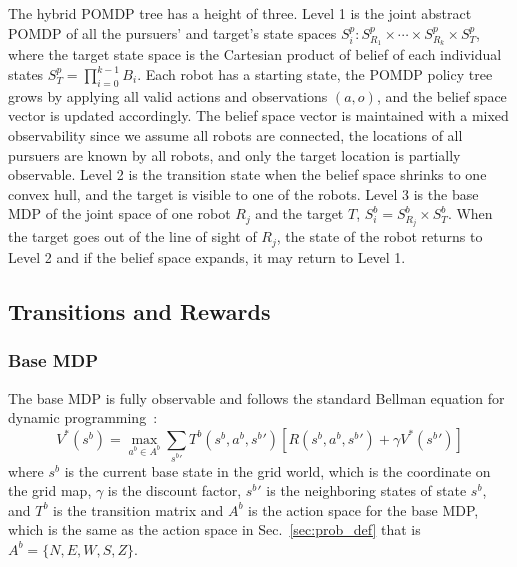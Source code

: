 \documentclass[../main.tex]{subfiles}
\begin{document}
The hybrid POMDP tree has a height of three. Level 1 is the joint abstract POMDP of all the pursuers' and target's state spaces $S^p_i: S^p_{R_1} \times \cdots \times S^p_{R_k} \times S^p_{T}$, where the target state space is the Cartesian product of belief of each individual states $S^p_T = \prod_{i =0}^{k-1} B_i$. Each robot has a starting state, the POMDP policy tree grows by applying all valid actions and observations $(a, o)$, and the belief space vector is updated accordingly.
The belief space vector is maintained with a mixed observability since we assume all robots are connected, the locations of all pursuers are known by all robots, and only the target location is partially observable.
Level 2 is the transition state when the belief space shrinks to one convex hull, and the target is visible to one of the robots.
Level 3 is the base MDP of the joint space of one robot $R_j$ and the target $T$, $S^b_i = S^b_{R_j} \times S^b_T$. When the target goes out of the line of sight of $R_j$, the state of the robot returns to Level 2 and if the belief space expands, it may return to Level 1. 

\subsection{Transitions and Rewards} \label{sec:trans_reward}



\subsubsection{Base MDP}
The base MDP is fully observable and follows the standard Bellman equation for dynamic programming~\cite{bellman2013dynamic}: 
\begin{equation}
    V^{*}(s^b) = \max_{a^b \in A^{b}} \sum_{{s^{b}}'} T^b(s^b, a^b, {s^{b}}') [R(s^b, a^b, {s^{b}}') + \gamma V^{*}({s^{b}}')] 
\end{equation}%
where $s^b$ is the current base state in the grid world, which is the coordinate on the grid map, $\gamma$ is the discount factor, ${s^b}'$ is the neighboring states of state $s^b$, and $T^b$ is the transition matrix and $A^b$ is the action space for the base MDP, which is the same as the action space in Sec.~\ref{sec:prob_def} that is $A^b = \{N, E, W, S, Z \}$. 
\end{document}
